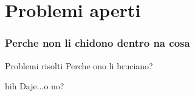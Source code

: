 \section{Problemi aperti}
\begin{frame}
  \frametitle{Perche non li chidono dentro na cosa}
  \begin{block}{Problemi risolti}
    Perche ono li bruciano?
  \end{block}
  \begin{block}{hih}
    Daje...o no?
  \end{block}
\end{frame}
